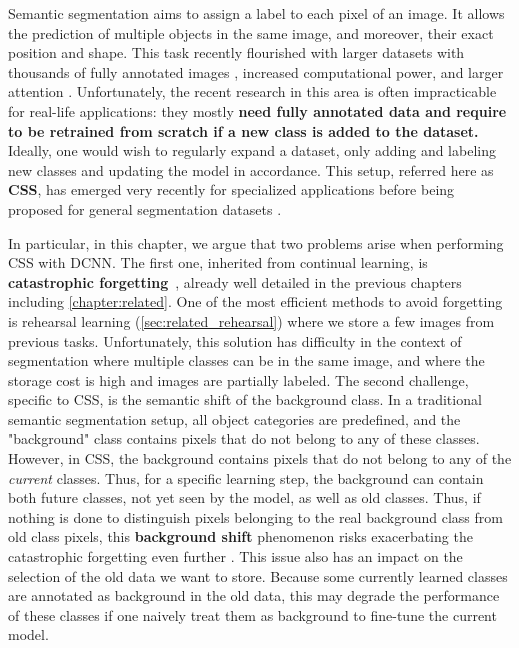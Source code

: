 Semantic segmentation aims to assign a label to each pixel of an image.
It allows the prediction of multiple objects in the same image, and moreover, their exact position
and shape. This task recently flourished \citep{tao2020HRNet,zhang2020resnest,chen2018ZPSA} with
larger datasets with thousands of fully annotated images
\citep{zhou2017adedataset,neuhold2017mapillary}, increased computational power, and larger attention
\citep{wang2020axialdeeplab}. Unfortunately, the recent research in this area is often impracticable
for real-life applications: they mostly \textbf{need fully annotated data and require to be retrained from
    scratch if a new class is added to the dataset.} Ideally, one would wish to regularly expand a
dataset, only adding and labeling new classes and updating the model in accordance. This setup,
referred here as \textbf{\acf{CSS}}, has emerged very recently for specialized
applications
\citep{ozdemir2018learnthenewkeeptheold,ozdemir2019segmentationanotomical,tasar19incrementsegmentationremotesensing}
before being proposed for general segmentation datasets
\citep{michieli2019ilt,cermelli2020modelingthebackground}.


In particular, in this chapter, we argue that two problems arise when performing \ac{CSS} with
\acs{DCNN}. The first one, inherited from continual learning, is \textbf{catastrophic
    forgetting}~\citep{robins1995catastrophicforgetting}, already well detailed in the previous chapters
including \autoref{chapter:related}. One of the most efficient methods to avoid forgetting is rehearsal
learning (\autoref{sec:related_rehearsal}) where we store a few images from previous tasks.
Unfortunately, this solution has difficulty in the context of segmentation where multiple classes
can be in the same image, and where the storage cost is high and images are partially labeled. The
second challenge, specific to \ac{CSS}, is the semantic shift of the background class. In a
traditional semantic segmentation setup, all object categories are predefined, and the "background"
class contains pixels that do not belong to any of these classes. However, in \ac{CSS}, the
background contains pixels that do not belong to any of the \textit{current} classes. Thus, for a
specific learning step, the background can contain both future classes, not yet seen by the model,
as well as old classes. Thus, if nothing is done to distinguish pixels belonging to the real
background class from old class pixels, this \textbf{background shift} phenomenon risks exacerbating
the catastrophic forgetting even further \citep{cermelli2020modelingthebackground}. This issue also
has an impact on the selection of the old data we want to store. Because some currently learned
classes are annotated as background in the old data, this may degrade the performance of these
classes if one naively treat them as background to fine-tune the current model.

